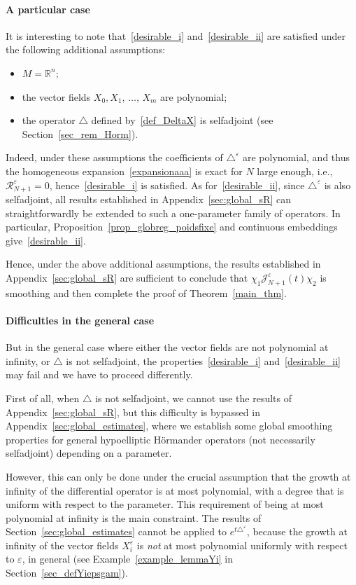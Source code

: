 \documentclass[10pt]{amsart}
\theoremstyle{definition}\newtheorem{defi}[theo]{Definition}\newtheorem{rema}[theo]{Remark}\newtheorem{exam}[theo]{Example}\newtheorem{exem}[theo]{Example}\newtheorem{nota}[theo]{Notation}
\newcommand*\R{\mathbb{R}}
\newcommand{\calR}{\mathcal{R}}
\newcommand{\calJ}{\mathcal{J}}
\begin{document}
\paragraph{A particular case} It is interesting to note that~\eqref{desirable_i} and~\eqref {desirable_ii} are satisfied under the following additional assumptions:
\begin{itemize}
\item $M=\R^n$;
\item the vector fields $X_0, X_1,\,\ldots,\,X_m$ are polynomial;
\item the operator $\triangle$ defined by~\eqref{def_DeltaX} is selfadjoint (see Section~\ref{sec_rem_Horm}).
\end{itemize}
Indeed, under these assumptions the coefficients of $\triangle^\varepsilon$ are polynomial, and thus the homogeneous expansion~\eqref{expansionaaa} is exact for $N$ large enough, i.e., $\calR_{N+1}^\varepsilon=0$, hence~\eqref{desirable_i} is satisfied. As for~\eqref{desirable_ii}, since $\triangle^\varepsilon$ is also selfadjoint, all results established in Appendix~\ref{sec:global_sR} can straightforwardly be extended to such a one-parameter family of operators. In particular, Proposition~\ref{prop_globreg_poidsfixe} and continuous embeddings give~\eqref{desirable_ii}.

Hence, under the above additional assumptions, the results established in Appendix~\ref{sec:global_sR} are sufficient to conclude that $\chi_1\calJ_{N+1}^\varepsilon(t)\chi_2$ is smoothing and then complete the proof of Theorem~\ref{main_thm}.

\break

\paragraph{Difficulties in the general case}
But in the general case where either the vector fields are not polynomial at infinity, or $\triangle$ is not selfadjoint, the properties~\eqref{desirable_i} and~\eqref{desirable_ii} may fail and we have to proceed differently.

First of all, when $\triangle$ is not selfadjoint, we cannot use the results of Appendix~\ref{sec:global_sR}, but this difficulty is bypassed in Appendix~\ref{sec:global_estimates}, where we establish some global smoothing properties for general hypoelliptic H\"ormander operators (not necessarily selfadjoint) depending on a parameter.

However, this can only be done under the crucial assumption that the growth at infinity of the differential operator is at most polynomial, with a degree that is uniform with respect to the parameter. This requirement of being at most polynomial at infinity is the main constraint. The results of Section~\ref{sec:global_estimates} cannot be applied to $e^{t\triangle^\varepsilon}$, because the growth at infinity of the vector fields $X_i^\varepsilon$ is \emph{not} at most polynomial uniformly with respect to $\varepsilon$, in general (see Example~\ref{example_lemmaYi} in Section~\ref{sec_defYiepsgam}).
\end{document}
